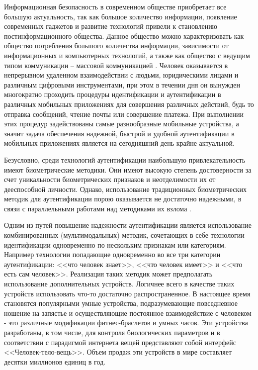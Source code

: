 
{\actuality} Информационная безопасность в современном обществе приобретает все большую актуальность, так как большое количество информации, появление современных гаджетов и развитие технологий привели к становлению постинформационного общества. Данное общество можно характеризовать как  общество потребления большого количества информации, зависимости от информационных и компьютерных технологий, а также как общество с ведущим типом коммуникации – массовой коммуникацией \cite{самойлова2016трансформации}. Человек оказывается в непрерывном удаленном взаимодействии с людьми, юридическими лицами и различным цифровыми инструментами, при этом в течении дня он вынужден многократно проходить процедуры идентификации и аутентификации в различных мобильных приложениях для совершения различных действий, будь то отправка сообщений, чтение почты или совершение платежа. При выполнении этих процедур задействованы самые разнообразные мобильные устройства, а значит задача обеспечения надежной, быстрой и удобной аутентификации в мобильных приложениях является на сегодняшний день крайне актуальной.






Безусловно, среди технологий аутентификации наибольшую привлекательность имеют биометрические методики. Они имеют высокую степень достоверности за счет уникальности биометрических признаков и неотделимости их от дееспособной личности. Однако, использование традиционных биометрических методик для аутентификации порою оказывается не достаточно надежными, в связи с параллельными работами над методиками их взлома \cite{богданов2017обзор}. 

Одним из путей повышение надежности аутентификации является использование комбинированных (мультимодальных) методик, сочетающих в себе технологии идентификации одновременно по нескольким признакам или категориям. Например технологии попадающие одновременно во все три категории аутентификации: <<что человек знает>>, <<что человек имеет>> и <<что есть сам человек>>. Реализация таких методик может предполагать использование дополнительных устройств. Логичнее всего в качестве таких устройств использовать что-то достаточно распространенное. В настоящее время становятся популярными умные устройства, подразумевающие повседневное ношение на запястье и осуществляющие постоянное взаимодействие с человеком - это различные модификации фитнес-браслетов и умных часов. Эти устройства разработаны, в том числе, для контроля биологических параметров и в соответствии с парадигмой интернета вещей представляют собой интерфейс <<Человек-тело-вещь>>. Объем продаж эти устройств в мире составляет десятки миллионов единиц в год.

